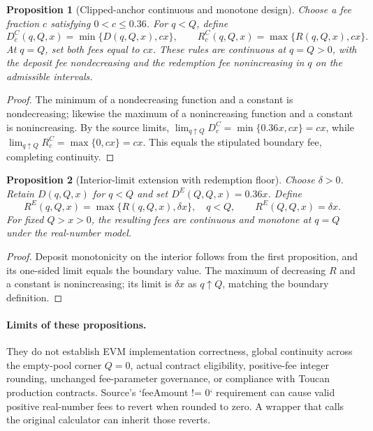 \documentclass[11pt]{article}
\newtheorem{proposition}{Proposition}
\begin{document}
\begin{proposition}[Clipped-anchor continuous and monotone design]
Choose a fee fraction $c$ satisfying $0<c\le0.36$. For $q<Q$, define
\begin{equation}
D^{C}_c(q,Q,x)=\min\{D(q,Q,x),cx\},\qquad
R^{C}_c(q,Q,x)=\max\{R(q,Q,x),cx\}.
\end{equation}
At $q=Q$, set both fees equal to $cx$. These rules are continuous at $q=Q>0$, with the deposit fee nondecreasing and the redemption fee nonincreasing in $q$ on the admissible intervals.
\end{proposition}
\begin{proof}
The minimum of a nondecreasing function and a constant is nondecreasing; likewise the maximum of a nonincreasing function and a constant is nonincreasing. By the source limits, $\lim_{q\uparrow Q}D^{C}_c=\min\{0.36x,cx\}=cx$, while $\lim_{q\uparrow Q}R^{C}_c=\max\{0,cx\}=cx$. This equals the stipulated boundary fee, completing continuity.
\end{proof}

\begin{proposition}[Interior-limit extension with redemption floor]
Choose $\delta>0$. Retain $D(q,Q,x)$ for $q<Q$ and set $D^E(Q,Q,x)=0.36x$. Define
\begin{equation}
R^E(q,Q,x)=\max\{R(q,Q,x),\delta x\},\quad q<Q,
\qquad R^E(Q,Q,x)=\delta x.
\end{equation}
For fixed $Q>x>0$, the resulting fees are continuous and monotone at $q=Q$ under the real-number model.
\end{proposition}
\begin{proof}
Deposit monotonicity on the interior follows from the first proposition, and its one-sided limit equals the boundary value. The maximum of decreasing $R$ and a constant is nonincreasing; its limit is $\delta x$ as $q\uparrow Q$, matching the boundary definition.
\end{proof}

\paragraph{Limits of these propositions.}
They do not establish EVM implementation correctness, global continuity across the empty-pool corner $Q=0$, actual contract eligibility, positive-fee integer rounding, unchanged fee-parameter governance, or compliance with Toucan production contracts. Source's `feeAmount != 0` requirement can cause valid positive real-number fees to revert when rounded to zero. A wrapper that calls the original calculator can inherit those reverts.
\end{document}
